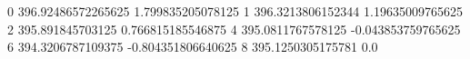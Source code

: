 0 396.92486572265625 1.799835205078125
1 396.3213806152344 1.19635009765625
2 395.891845703125 0.766815185546875
4 395.0811767578125 -0.043853759765625
6 394.3206787109375 -0.804351806640625
8 395.1250305175781 0.0

